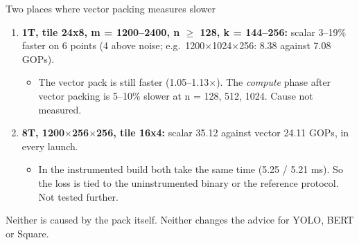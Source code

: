 \begin{frame}{Two places where vector packing measures slower}
\small
\begin{enumerate}\setlength\itemsep{6pt}
\item \textbf{1T, tile 24x8, m = 1200--2400, n $\ge$ 128, k = 144--256:} scalar 3--19\% faster on 6 points (4 above noise; e.g.\ 1200$\times$1024$\times$256: 8.38 against 7.08 GOPs).
  \begin{itemize}
  \item The vector pack is still faster (1.05--1.13$\times$). The \emph{compute} phase after vector packing is 5--10\% slower at n = 128, 512, 1024. Cause not measured.
  \end{itemize}
\item \textbf{8T, 1200$\times$256$\times$256, tile 16x4:} scalar 35.12 against vector 24.11 GOPs, in every launch.
  \begin{itemize}
  \item In the instrumented build both take the same time (5.25 / 5.21 ms). So the loss is tied to the uninstrumented binary or the reference protocol. Not tested further.
  \end{itemize}
\end{enumerate}
\vspace{4pt}
Neither is caused by the pack itself. Neither changes the advice for YOLO, BERT or Square.
\end{frame}
